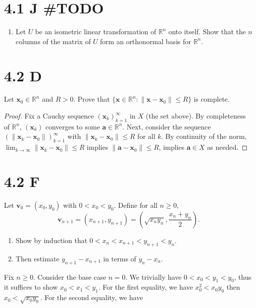 \documentclass[../main.tex]{subfiles}
\begin{document}
\section{4.1 J \#TODO}
\begin{problem}
\begin{enumerate}[label=(\alph*)]
	\item Let $U$ be an isometric linear transformation of $\mathbb{R}^n$ onto itself.
	      Show that the $n$ columns of the matrix of $U$ form an orthonormal basis for $\mathbb{R}^n$.
\end{enumerate}
\end{problem}

\section{4.2 D}
\begin{problem}
Let $\mathbf{x}_0 \in \mathbb{R}^n$ and $R > 0$.
Prove that $\{ \mathbf{x} \in \mathbb{R}^n : \|\mathbf{x} - \mathbf{x}_0\| \le R \}$ is complete.
\end{problem}
\begin{proof}
	Fix a Cauchy sequence $(\mathbf{x}_k)_{k = 1}^\infty$ in $X$ (the set above).
	By completeness of $\mathbb{R}^n$, $(\mathbf{x}_k)$ converges to some $\mathbf{a} \in \mathbb{R}^n$.
	Next, consider the sequence $(\| \mathbf{x}_k - \mathbf{x}_0 \|)_{k = 1}^\infty$ with $\| \mathbf{x}_k - \mathbf{x}_0 \| \le R$ for all $k$.
	By continuity of the norm, $\lim_{k \to \infty} \| \mathbf{x}_k - \mathbf{x}_0 \| \le R$ implies $\| \mathbf{a} - \mathbf{x}_0 \| \le R$, implies $\mathbf{a} \in X$ as needed.
\end{proof}

\section{4.2 F}
\begin{problem}
Let $\mathbf{v}_0 = (x_0, y_0)$ with $0 < x_0 < y_0$.
Define for all $n \ge 0$,
\[
	\mathbf{v}_{n + 1} = (x_{n + 1}, y_{n + 1}) = \left(\sqrt{x_n y_n}, \frac{x_n + y_n}{2}\right).
\]
\begin{enumerate}[label=(\alph*)]
	\item Show by induction that $0 < x_n < x_{n + 1} < y_{n + 1} < y_n$.
	\item Then estimate $y_{n + 1} - x_{n + 1}$ in terms of $y_n - x_n$.
\end{enumerate}
\end{problem}
Fix $n \ge 0$.
Consider the base case $n = 0$.
We trivially have $0 < x_0 < y_1 < y_0$, thus it suffices to show $x_0 < x_1 < y_1$.
For the first equality, we have $x_0^2 < x_0 y_0$ then $x_0 < \sqrt{x_0 y_0}$.
For the second equality, we have
\end{document}
